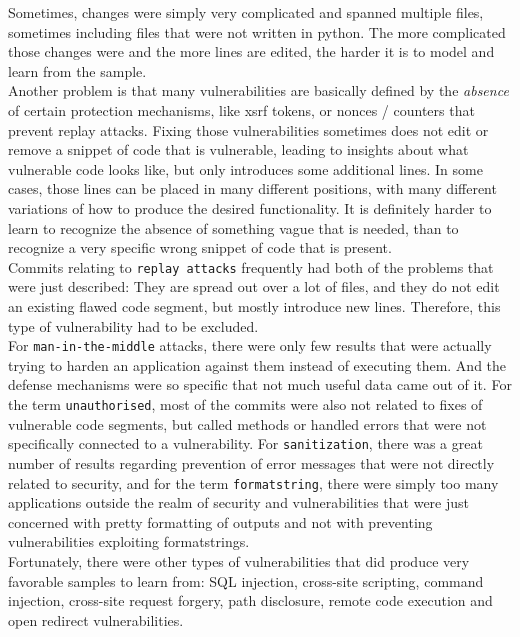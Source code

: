 \documentclass[
a4paper,
pagesize,
pdftex,
12pt,
ngerman,
fleqn,
final,
]{scrartcl}
\begin{document}
	Sometimes, changes were simply very complicated and spanned multiple files, sometimes including files that were not written in python. The more complicated those changes were and the more lines are edited, the harder it is to model and learn from the sample.\\
	Another problem is that many vulnerabilities are basically defined by the \textit{absence} of certain protection mechanisms, like xsrf tokens, or nonces / counters that prevent replay attacks. Fixing those vulnerabilities sometimes does not edit or remove a snippet of code that is vulnerable, leading to insights about what vulnerable code looks like, but only introduces some additional lines. In some cases, those lines can be placed in many different positions, with many different variations of how to produce the desired functionality. It is definitely harder to learn to recognize the absence of something vague that is needed, than to recognize a very specific wrong snippet of code that is present.\\
	Commits relating to \texttt{replay attacks} frequently had both of the problems that were just described: They are spread out over a lot of files, and they do not edit an existing flawed code segment, but mostly introduce new lines. Therefore, this type of vulnerability had to be excluded.\\	
	For \texttt{man-in-the-middle} attacks, there were only few results that were actually trying to harden an application against them instead of executing them. And the defense mechanisms were so specific that not much useful data came out of it. For the term \texttt{unauthorised}, most of the commits were also not related to fixes of vulnerable code segments, but called methods or handled errors that were not specifically connected to a vulnerability. For \texttt{sanitization}, there was a great number of results regarding prevention of error messages that were not directly related to security, and for the term \texttt{formatstring}, there were simply too many applications outside the realm of security and vulnerabilities that were just concerned with pretty formatting of outputs and not with preventing vulnerabilities exploiting formatstrings.\\
	Fortunately, there were other types of vulnerabilities that did produce very favorable samples to learn from: SQL injection, cross-site scripting, command injection, cross-site request forgery, path disclosure, remote code execution and open redirect vulnerabilities. 
	
\end{document}
